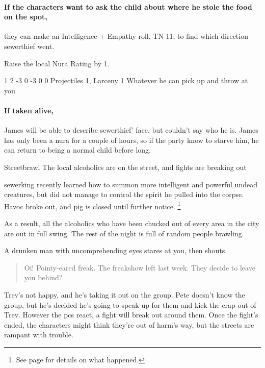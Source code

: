 \paragraph{If the characters want to ask the child about where he stole the food on the spot,}
they can make an Intelligence + Empathy roll, TN 11, to find which direction \gls{sewerthief} went.

Raise the local Nura Rating by 1.

{1}%
{2}%
{{-3}%
{0}%
{-3}}%
{0}%
{0}%
{Projectiles 1, Larceny 1}%
{Whatever he can pick up and throw at you}%
{}

\paragraph{If taken alive,}
James will be able to describe \gls{sewerthief}' face, but couldn't say who he is.
James has only been a nura for a couple of hours, so if the party know to starve him, he can return to being a normal child before long.

{\N Streetbrawl}%
{The local alcoholics are on the street, and fights are breaking out}%
\label{ghastEscape}

\Gls{sewerking} recently learned how to summon more intelligent and powerful undead creatures, but did not manage to control the spirit he pulled into the corpse.
Havoc broke out, and \gls{pig} is closed until further notice.
\footnote{See page \pageref{pig_pantry} for details on what happened.}

As a result, all the alcoholics who have been chucked out of every area in the city are out in full swing.
The rest of the night is full of random people brawling.

\begin{boxtext}

A drunken man with uncomprehending eyes stares at you, then shouts.

\begin{quotation}

  Oi! Pointy-eared freak.  The freakshow left last week.  They decide to leave you behind?

\end{quotation}

\end{boxtext}

Trev's not happy, and he's taking it out on the group.
Pete doesn't know the group, but he's decided he's going to speak up for them and kick the crap out of Trev.
However the \glspl{pc} react, a fight will break out around them.
Once the fight's ended, the characters might think they're out of harm's way, but the streets are rampant with trouble.

